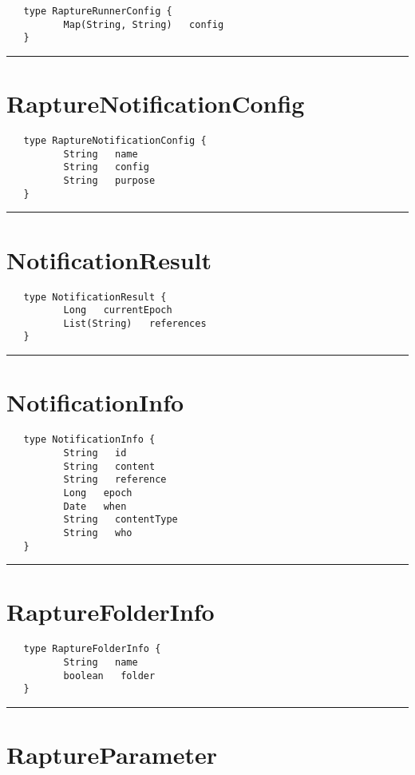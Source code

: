 \begin{verbatim}
   type RaptureRunnerConfig {
          Map(String, String)   config
   }
\end{verbatim}

\rule{15cm}{2pt}
\section{RaptureNotificationConfig}
\label{type:RaptureNotificationConfig}

\begin{verbatim}
   type RaptureNotificationConfig {
          String   name
          String   config
          String   purpose
   }
\end{verbatim}

\rule{15cm}{2pt}
\section{NotificationResult}
\label{type:NotificationResult}

\begin{verbatim}
   type NotificationResult {
          Long   currentEpoch
          List(String)   references
   }
\end{verbatim}

\rule{15cm}{2pt}
\section{NotificationInfo}
\label{type:NotificationInfo}

\begin{verbatim}
   type NotificationInfo {
          String   id
          String   content
          String   reference
          Long   epoch
          Date   when
          String   contentType
          String   who
   }
\end{verbatim}

\rule{15cm}{2pt}
\section{RaptureFolderInfo}
\label{type:RaptureFolderInfo}

\begin{verbatim}
   type RaptureFolderInfo {
          String   name
          boolean   folder
   }
\end{verbatim}

\rule{15cm}{2pt}
\section{RaptureParameter}
\label{type:RaptureParameter}

